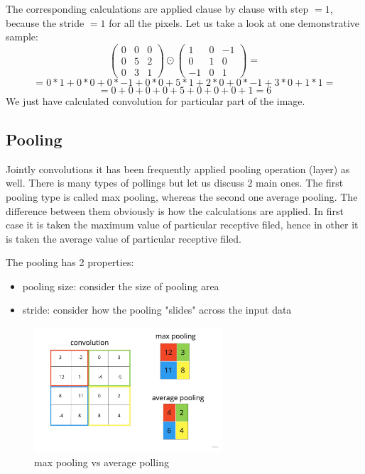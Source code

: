 The corresponding calculations are applied clause by clause with step $= 1$, because the stride $= 1$ for all the pixels. Let us take a look at one demonstrative sample:   
\[ \begin{pmatrix} 0 & 0 & 0 \\ 0 & 5 & 2 \\ 0 & 3 & 1 \end{pmatrix} \odot \begin{pmatrix} 1 & 0 & -1 \\ 0 & 1 & 0 \\ -1 & 0 & 1 \end{pmatrix} = \]
\[ = 0*1 + 0*0 + 0*-1 + 0*0 + 5*1 + 2*0 + 0*-1 + 3*0 + 1*1 = \] 
\[ = 0 + 0 + 0 + 0 + 5 + 0 + 0 + 0 + 1= 6 \]
We just have calculated convolution for particular part of the image. 

\subsection{Pooling}
Jointly convolutions it has been frequently applied pooling operation (layer) as well. 
There is many types of pollings but let us discuss 2 main ones. 
The first pooling type is called max pooling, whereas the second one average pooling. The difference between them obviously is how the calculations are applied. In first case it is taken the maximum value of particular receptive filed, hence in other it is taken the average value of particular receptive filed.

The pooling has 2 properties:
\begin{itemize}
    \item pooling size: consider the size of pooling area 
    \item stride: consider how the pooling "slides" across the input data 
\end{itemize}    

\begin{figure}[h]
    \centering \includegraphics[width=7cm]{images/pooling.jpg}
    \caption {max pooling vs average polling}
\end{figure}

